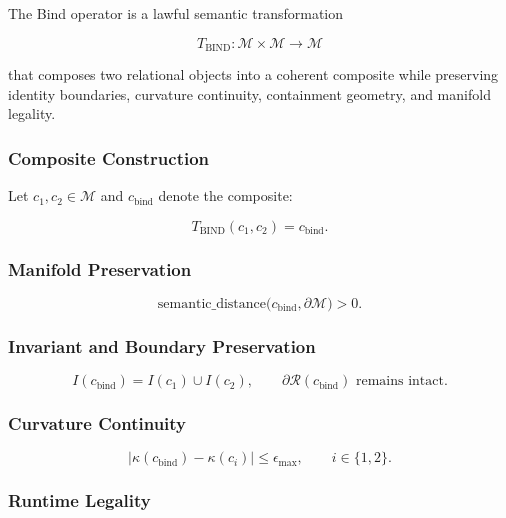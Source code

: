 \noindent The Bind operator is a lawful semantic transformation



\[
T_{\mathrm{BIND}} : \mathcal{M} \times \mathcal{M} \rightarrow \mathcal{M}
\]



that composes two relational objects into a coherent composite while preserving
identity boundaries, curvature continuity, containment geometry, and manifold
legality.

\subsubsection*{Composite Construction}

Let $c_1, c_2 \in \mathcal{M}$ and $c_{\mathrm{bind}}$ denote the composite:



\[
T_{\mathrm{BIND}}(c_1, c_2) = c_{\mathrm{bind}}.
\]



\subsubsection*{Manifold Preservation}



\[
\text{semantic\_distance}\big(c_{\mathrm{bind}}, \partial \mathcal{M}\big) > 0.
\]



\subsubsection*{Invariant and Boundary Preservation}



\[
I(c_{\mathrm{bind}}) = I(c_1) \cup I(c_2),
\qquad
\partial \mathcal{R}(c_{\mathrm{bind}}) \text{ remains intact}.
\]



\subsubsection*{Curvature Continuity}



\[
|\kappa(c_{\mathrm{bind}}) - \kappa(c_i)| \le \epsilon_{\max},
\qquad i \in \{1,2\}.
\]



\subsubsection*{Runtime Legality}

